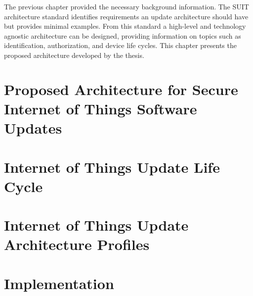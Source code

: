 \documentclass[0-thesis.tex]{subfiles}
\begin{document}
The previous chapter provided the necessary background information. The SUIT architecture
standard identifies requirements an update architecture should have but provides minimal
examples. From this standard a high-level and technology agnostic architecture can be
designed, providing information on topics such as identification, authorization, and
device life cycles. This chapter presents the proposed architecture developed by the
thesis.


\section{Proposed Architecture for Secure Internet of Things Software Updates}


\section{Internet of Things Update Life Cycle}


\section{Internet of Things Update Architecture Profiles}


\section{Implementation}

\end{document}
